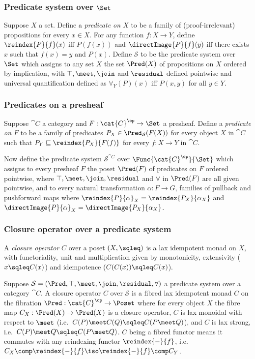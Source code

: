 \subsubsection{Predicate system over $\Set$}

Suppose $X$ a set. Define a \emph{predicate on $X$} to be a family of (proof-irrelevant) propositions for
every $x \in X$. For any function $f: X \to Y$, define $\reindex{P}{f}(x)$ iff $P(f(x))$ and
$\directImage{P}{f}(y)$ iff there exists $x$ such that $f(x) = y$ and $P(x)$. Define $\mathcal{S}$ to be the
predicate system over $\Set$ which assigns to any set $X$ the set $\Pred(X)$ of propositions on $X$ ordered by
implication, with $\top, \meet, \join$ and $\residual$ defined pointwise and universal quantification defined
as $\forall_Y(P)(x)$ iff $P(x,y)$ for all $y \in Y$.

\subsubsection{Predicates on a presheaf}

Suppose $\cat{C}$ a category and $F: \cat{C}^\op \to \Set$ a presheaf. Define a \emph{predicate on $F$} to be
a family of predicates $P_X \in \Pred_\mathcal{S}(F(X))$ for every object $X$ in $\cat{C}$ such that $P_Y
\sqsubseteq \reindex{P_X}{F(f)}$ for every $f: X \to Y$ in $\cat{C}$.

Now define the predicate system $\mathcal{S}^{\cat{C}}$ over $\Func{\cat{C}^\op}{\Set}$ which assigns to every
presheaf $F$ the poset $\Pred(F)$ of predicates on $F$ ordered pointwise, where $\top, \meet, \join,
\residual$ and $\forall$ in $\Pred(F)$ are all given pointwise, and to every natural transformation $\alpha: F
\to G$, families of pullback and pushforward maps where $\reindex{P}{\alpha}_X = \reindex{P_X}{\alpha_X}$ and
$\directImage{P}{\alpha}_X = \directImage{P_X}{\alpha_X}$.

\subsubsection{Closure operator over a predicate system}

A \emph{closure operator} $C$ over a poset $(X, \sqleq)$ is a lax idempotent monad on $X$, with functoriality,
unit and multiplication given by monotonicity, extensivity ($x \sqleq C(x)$) and idempotence ($C(C(x)) \sqleq
C(x)$).

Suppose $\mathcal{S} = (\Pred, \top, \meet, \join, \residual, \forall)$ a predicate system over a category
$\cat{C}$. A closure operator $C$ over $\mathcal{S}$ is a fibred lax idempotent monad $C$ on the fibration
$\Pred: \cat{C}^\op \to \Poset$ where for every object $X$ the fibre map $C_X: \Pred(X) \to \Pred(X)$ is a
closure operator, $C$ is lax monoidal with respect to $\meet$ (i.e.~$C(P) \meet C(Q) \sqleq C(P \meet Q)$),
and $C$ is lax strong, i.e.~$C(P) \meet Q \sqleq C(P \meet Q)$. $C$ being a fibred functor means it commutes
with any reindexing functor $\reindex{-}{f}$, i.e.~$C_X \comp \reindex{-}{f} \iso \reindex{-}{f} \comp C_Y$.

